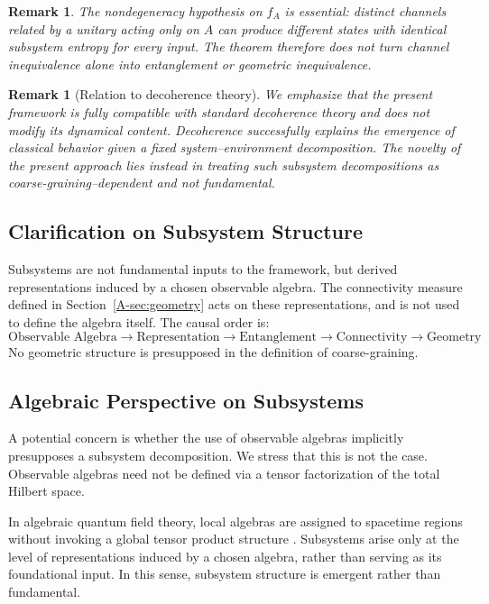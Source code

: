 \documentclass[12pt,a4paper,openany]{book}
\newtheorem{remark}[theorem]{Remark}
\begin{document}
\begin{remark}
The nondegeneracy hypothesis on $f_A$ is essential: distinct channels related by a unitary acting only on $A$ can produce different states with identical subsystem entropy for every input.  The theorem therefore does not turn channel inequivalence alone into entanglement or geometric inequivalence.
\end{remark}

\begin{remark}[Relation to decoherence theory]
We emphasize that the present framework is fully compatible with standard decoherence theory and does not modify its dynamical content. 
Decoherence successfully explains the emergence of classical behavior given a fixed system--environment decomposition. 
The novelty of the present approach lies instead in treating such subsystem decompositions as coarse-graining--dependent and not fundamental.
\end{remark}

\subsection{Clarification on Subsystem Structure}

Subsystems are not fundamental inputs to the framework, but derived representations induced by a chosen observable algebra. 
The connectivity measure defined in Section~\ref{A-sec:geometry} acts on these representations, and is not used to define the algebra itself. 
The causal order is:
\[
\text{Observable Algebra} \to \text{Representation} \to \text{Entanglement} \to \text{Connectivity} \to \text{Geometry}
\]
No geometric structure is presupposed in the definition of coarse-graining.

\subsection{Algebraic Perspective on Subsystems}

A potential concern is whether the use of observable algebras implicitly presupposes a subsystem decomposition. 
We stress that this is not the case. 
Observable algebras need not be defined via a tensor factorization of the total Hilbert space.

In algebraic quantum field theory, local algebras are assigned to spacetime regions without invoking a global tensor product structure \cite{Haag1996}. 
Subsystems arise only at the level of representations induced by a chosen algebra, rather than serving as its foundational input. 
In this sense, subsystem structure is emergent rather than fundamental.
\end{document}
